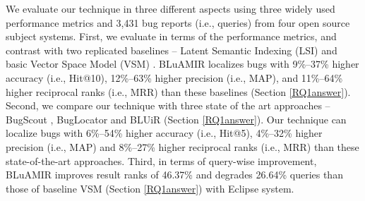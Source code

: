 \documentclass[conference]{IEEEtran}
\begin{document}

We evaluate our technique in three different aspects using
three widely used performance metrics and 3,431 bug reports (i.e.,
queries) from four open source subject systems. 
First, we evaluate in terms of the performance metrics, and contrast with two replicated baselines -- Latent Semantic Indexing (LSI) \cite{MarcusLSI} and basic Vector Space Model (VSM) \cite{vector-space-model}.
BLuAMIR localizes bugs with 9\%--37\% higher accuracy (i.e., Hit@10), 12\%--63\% higher precision (i.e., MAP), and 11\%--64\% higher reciprocal ranks (i.e., MRR) than these baselines (Section  \ref{RQ1answer}).
Second, we compare our technique with three state of the art approaches -- BugScout \cite{Nguyen}, BugLocator \cite{Jian} and BLUiR \cite{Saha} (Section \ref{RQ1answer}).
Our technique can localize bugs with 6\%--54\% higher accuracy (i.e., Hit@5), 4\%--32\% higher precision (i.e., MAP) and 8\%--27\% higher reciprocal ranks (i.e., MRR) than these state-of-the-art approaches.
Third, in terms of query-wise improvement, BLuAMIR improves result ranks of 46.37\% and degrades 26.64\% queries than those of baseline VSM (Section \ref{RQ1answer}) with Eclipse system.
\end{document}
